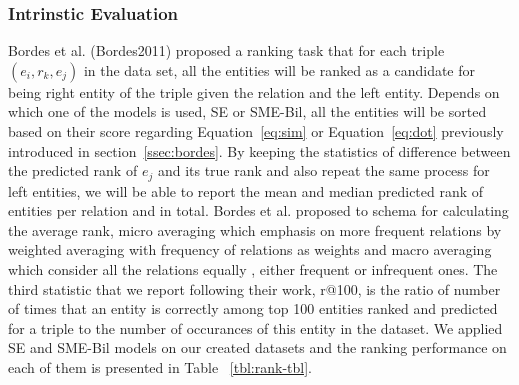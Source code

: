 \subsubsection{Intrinstic Evaluation}
\label{ssec:ent-link-intrinsic}

Bordes et al. (Bordes2011) proposed a ranking task that for each triple $(e_{i} , r_{k}, e_{j} )$ in the data set,
 all the entities will be ranked as a candidate for being right entity of the triple 
 given the relation and the left entity. Depends on which one of the models is used, SE or SME-Bil, all the entities will be sorted
  based on their score regarding Equation~\eqref{eq:sim} or Equation~\ref{eq:dot} previously introduced in section~\ref{ssec:bordes}. 
  By keeping the statistics of difference between the predicted rank of $e_{j}$ and its true rank and also repeat the same process
  for left entities, we will be able to report the mean and median predicted rank of entities per relation and in total. Bordes et al.
   proposed to schema for calculating the average rank, micro averaging which emphasis on more frequent relations by
    weighted averaging with frequency of relations as weights and macro averaging which consider all the relations equally
    , either frequent or infrequent ones. The third statistic that we report following their work, r@100, is the ratio of number of times that 
    an entity is correctly among top 100 entities ranked and predicted for a triple to the number of occurances of this entity in the dataset.
    We applied SE and SME-Bil models on our created datasets and the ranking performance on each of them is presented in Table ~\ref{tbl:rank-tbl}.
	
